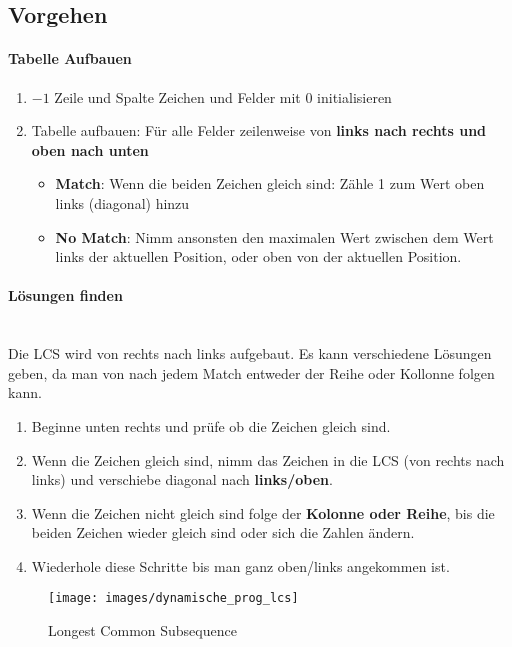 \clearpage

\subsection{Vorgehen}
\paragraph{Tabelle Aufbauen}
\begin{enumerate}
	\item $-1$ Zeile und Spalte Zeichen und Felder mit 0 initialisieren
	\item Tabelle aufbauen: Für alle Felder zeilenweise von \textbf{links nach rechts und oben nach unten}
	\begin{itemize}
		\item \textbf{Match}: Wenn die beiden Zeichen gleich sind: Zähle 1 zum Wert oben links (diagonal) hinzu
		\item \textbf{No Match}: Nimm ansonsten den maximalen Wert zwischen dem Wert links der aktuellen Position, oder oben von der aktuellen Position.
	\end{itemize}
\end{enumerate}

\paragraph{Lösungen finden} \hfill \\
Die LCS wird von  rechts nach links aufgebaut. Es kann verschiedene Lösungen geben, da man von nach jedem Match entweder der Reihe oder Kollonne folgen kann.
\begin{enumerate}
	\item Beginne unten rechts und prüfe ob die Zeichen gleich sind. 
	\item Wenn die Zeichen gleich sind, nimm das Zeichen in die LCS (von rechts nach links) und verschiebe diagonal nach \textbf{links/oben}.
	\item Wenn die Zeichen nicht gleich sind folge der \textbf{Kolonne oder Reihe}, bis die beiden Zeichen wieder gleich sind oder sich die Zahlen ändern.
	\item Wiederhole diese Schritte bis man ganz oben/links angekommen ist.
\end{enumerate}


\begin{figure}[h]
\centering
\texttt{[image: images/dynamische\_prog\_lcs]}
\caption{Longest Common Subsequence}
\label{fig:dynamischeproglcs}
\end{figure}

